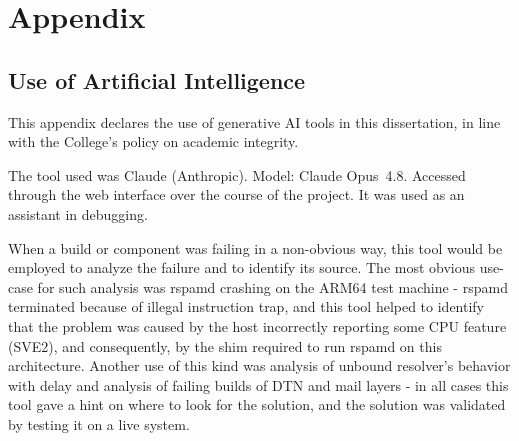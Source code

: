\chapter{Appendix}

\section{Use of Artificial Intelligence}

This appendix declares the use of generative AI tools in this dissertation, in
line with the College's policy on academic integrity.
 
The tool used was Claude (Anthropic). Model: Claude Opus~4.8. Accessed
through the web interface over the course of the project. It was used as an
assistant in debugging. 

When a build or component was failing in a non-obvious way, this tool would be employed to analyze the failure and to identify its source. The most obvious use-case for such analysis was rspamd crashing on the ARM64 test machine - rspamd terminated because of illegal instruction trap, and this tool helped to identify that the problem was caused by the host incorrectly reporting some CPU feature (SVE2), and consequently, by the shim required to run rspamd on this architecture. Another use of this kind was analysis of unbound resolver's behavior with delay and analysis of failing builds of DTN and mail layers - in all cases this tool gave a hint on where to look for the solution, and the solution was validated by testing it on a live system.